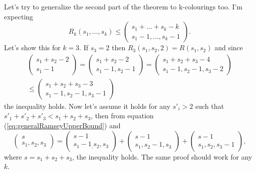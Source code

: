 Let's try to generalize the second part of the theorem to k-colourings too.
I'm expecting
\begin{equation}
    \label{eq:generalRamseyUpperBoundMultinomial}
    R_k(s_1,\dots,s_k) \leq
    \left(
    \begin{matrix}
        s_1+\dots+s_k-k \\
        s_1-1,\dots,s_k-1
    \end{matrix}
    \right) .
\end{equation}
Let's show this for $k=3$. If $s_3 = 2$ then $R_3(s_1,s_2,2) = R(s_1,s_2)$ and since
\begin{multline}
    \left(
    \begin{matrix}
        s_1+s_2-2 \\
        s_1-1
    \end{matrix}
    \right) =
    \left(
    \begin{matrix}
        s_1+s_2-2 \\
        s_1-1,s_2-1
    \end{matrix}
    \right)
    =
    \left(
    \begin{matrix}
        s_1+s_2+s_3-4 \\
        s_1-1,s_2-1,s_3-2
    \end{matrix}
    \right) \\
    \leq
    \left(
    \begin{matrix}
        s_1+s_2+s_3-3 \\
        s_1-1,s_2-1,s_3-1
    \end{matrix}
    \right)
    \nonumber
\end{multline}
the inequality holds.
Now let's assume it holds for any $s'_i > 2$ such that $s'_1+s'_2+s'_3 < s_1+s_2+s_3$, then from equation (\ref{eq:generalRamseyUpperBound}) and
\begin{equation}
    \left(
    \begin{matrix}
        s \\
        s_1,s_2,s_3
    \end{matrix}
    \right) =
    \left(
    \begin{matrix}
        s-1 \\
        s_1-1_,s_2,s_3
    \end{matrix}
    \right) +
    \left(
    \begin{matrix}
        s-1 \\
        s_1,s_2-1,s_3
    \end{matrix}
    \right) +
    \left(
    \begin{matrix}
        s-1 \\
        s_1,s_2,s_3-1
    \end{matrix}
    \right) , \nonumber
\end{equation}
where $s=s_1+s_2+s_3$, the inequality holds.
The same proof should work for any $k$.

